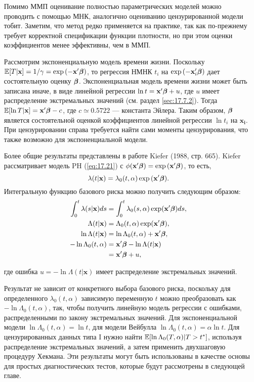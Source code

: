 \noindent
Помимо ММП оценивание полностью параметрических моделей можно проводить с помощью МНК, аналогично оцениванию цензурированной модели тобит. Заметим, что метод редко применяется на практике, так как по-прежнему требует корректной спецификации функции плотности, но при этом оценки коэффициентов менее эффективны, чем в ММП.

Рассмотрим экспоненциальную модель времени жизни. Поскольку $\mathbb{E}[T|\mathbf{x}]=1/\gamma=\exp{(-\mathbf{x}'\bm{\beta})}$, то регрессия НМНК $t_i$ на $\exp{(-\mathbf{x}_i'\bm{\beta})}$ дает состоятельную оценку $\bm{\beta}$. Экспоненциальная модель времени жизни может быть записана иначе, в виде линейной регрессии $\ln t=\mathbf{x}'\bm{\beta}+u$, где $u$ имеет распределение экстремальных значений (см. раздел \ref{sec:17.7.2}). Тогда $\mathbb{E}[\ln T|\mathbf{x}]=\mathbf{x}'\bm{\beta}-c$, где $c \simeq 0.5722$ --- константа Эйлера. Таким образом, $\bm{\beta}$ является состоятельной оценкой коэффициентов линейной регрессии $\ln t_i$ на $\mathbf{x_i}$. При цензурировании справа требуется найти сами моменты цензурирования, что также возможно для экспоненциальной модели.

Более общие результаты представлены в работе Kiefer (1988, стр. 665). Kiefer рассматривает модель PH (\ref{eq:17.21}) с $\phi(\mathbf{x}'\bm{\beta})=\exp{(\mathbf{x}'\bm{\beta})}$, то есть,
        $$\lambda(t|\mathbf{x})=\lambda_0(t,\alpha)\exp{(\mathbf{x}'\bm{\beta})}.$$
Интегральную функцию базового риска можно получить следующим образом:
        \begin{align}
        \label{eq:17.20}
        \int^{t}_{0}\lambda(s|\mathbf{x})ds&=\int^{t}_{0}\lambda_0(s,\alpha)\exp(\mathbf{x}'\bm{\beta})ds,\\
        \Lambda(t|\mathbf{x})&=\Lambda_0(t,\alpha)\exp(\mathbf{x}'\bm{\beta}),\notag\\
        \ln\Lambda(t|\mathbf{x})&=\ln\Lambda_0(t,\alpha)+\mathbf{x}'\bm{\beta},\notag\\
        -\ln\Lambda_0(t,\alpha)&=\mathbf{x}'\bm{\beta}-\ln\Lambda(t|\mathbf{x})\notag\\
        &=\mathbf{x}'\bm{\beta}+u,\notag
        \end{align}

где ошибка $u=-\ln\Lambda(t|\mathbf{x})$ имеет распределение экстремальных значений.


Результат не зависит от конкретного выбора базового риска, поскольку для определенного $\lambda_0(t,\alpha)$ зависимую переменную $t$ можно преобразовать как $-\ln\Lambda_0(t,\alpha)$, так, чтобы получить линейную модель регрессии с ошибками, распределенными по закону экстремальных значений. %
Для экспоненциальной модели $\ln\Lambda_0(t,\alpha)=\ln t$, для модели Вейбулла $\ln\Lambda_0(t,\alpha)=\alpha\ln t$. Для цензурированных данных типа I нужно найти $\mathbb{E}[\ln\Lambda_0(T,\alpha)|T>t^*]$, используя распределение экстремальных значений, а затем применить двухшаговую процедуру Хекмана. Эти результаты могут быть использованы в качестве основы для простых диагностических тестов, которые будут рассмотрены в следующей главе.





